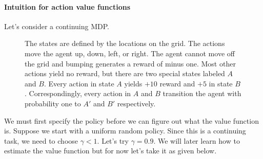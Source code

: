 \documentclass[12pt]{article}
\begin{document}
\paragraph{Intuition for action value functions} Let's consider a continuing MDP.

\begin{figure}[h]
  \centering
  \caption{\footnotesize The states are defined by the locations on the grid. The actions move the agent up, down, left, or right. The agent cannot move off the grid and bumping generates a reward of minus one. Most other actions yield no reward, but there are two special states labeled $A$ and $B$. Every action in state $A$ yields $+10$ reward and $+5$ in state $B$. Correspondingly, every action in $A$ and $B$ transition the agent with probability one to $A'$ and $B'$ respectively.}
\end{figure}

We must first specify the policy before we can figure out what the value function is. Suppose we start with a uniform random policy. Since this is a continuing task, we need to choose $\gamma < 1$. Let's try $\gamma = 0.9$.
We will later learn how to estimate the value function but for now let's take it as given below.
\end{document}
